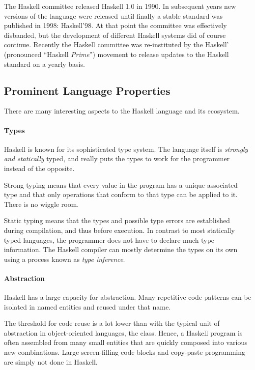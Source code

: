 The Haskell committee released Haskell 1.0 in 1990.
In subsequent years new versions of the language were released until
finally a stable standard was published in 1998: Haskell'98. At that point
the committee was effectively disbanded, but the development of different
Haskell systems did of course continue. Recently the Haskell committee 
was re-instituted by the Haskell' (pronounced ``Haskell \emph{Prime}'') movement to release updates to the
Haskell standard on a yearly basis.

\subsection{Prominent Language Properties}

There are many interesting aspects to the Haskell language and its ecosystem.

\paragraph{Types}
Haskell is known for its sophisticated type system. The language itself
is \emph{strongly and statically} typed, and really puts the types to
work for the programmer instead of the opposite.

Strong typing means that every value in the program has a unique associated type
and that only operations that conform to that type can be applied to it. There 
is no wiggle room.

Static typing means that the types and possible type errors are established
during compilation, and thus before execution. In contrast to most statically
typed languages, the programmer does not have to declare much type information.
The Haskell compiler can mostly determine the types on its own using a process
known as \emph{type inference}.

\paragraph{Abstraction}
Haskell has a large capacity for abstraction. Many repetitive code patterns can
be isolated in named entities and reused under that name.

The threshold for code reuse is a lot lower than with the typical unit of
abstraction in object-oriented languages, the class. Hence, a Haskell program
is often assembled from many small entities that are quickly composed into
various new combinations. Large screen-filling code blocks and copy-paste
programming are simply not done in Haskell.

